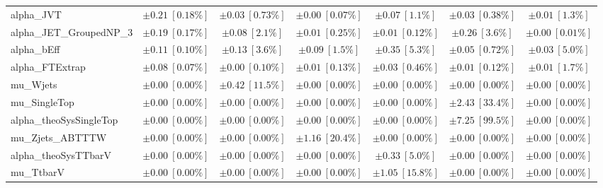 \begin{sidewaystable}
\begin{center}
\begin{tabular*}{\textwidth}{@{\extracolsep{\fill}}lcccccc}
alpha\_JVT         & $\pm 0.21\ [0.18\%] $          & $\pm 0.03\ [0.73\%] $          & $\pm 0.00\ [0.07\%] $          & $\pm 0.07\ [1.1\%] $          & $\pm 0.03\ [0.38\%] $          & $\pm 0.01\ [1.3\%] $       \\
alpha\_JET\_GroupedNP\_3         & $\pm 0.19\ [0.17\%] $          & $\pm 0.08\ [2.1\%] $          & $\pm 0.01\ [0.25\%] $          & $\pm 0.01\ [0.12\%] $          & $\pm 0.26\ [3.6\%] $          & $\pm 0.00\ [0.01\%] $       \\
alpha\_bEff         & $\pm 0.11\ [0.10\%] $          & $\pm 0.13\ [3.6\%] $          & $\pm 0.09\ [1.5\%] $          & $\pm 0.35\ [5.3\%] $          & $\pm 0.05\ [0.72\%] $          & $\pm 0.03\ [5.0\%] $       \\
alpha\_FTExtrap         & $\pm 0.08\ [0.07\%] $          & $\pm 0.00\ [0.10\%] $          & $\pm 0.01\ [0.13\%] $          & $\pm 0.03\ [0.46\%] $          & $\pm 0.01\ [0.12\%] $          & $\pm 0.01\ [1.7\%] $       \\
mu\_Wjets         & $\pm 0.00\ [0.00\%] $          & $\pm 0.42\ [11.5\%] $          & $\pm 0.00\ [0.00\%] $          & $\pm 0.00\ [0.00\%] $          & $\pm 0.00\ [0.00\%] $          & $\pm 0.00\ [0.00\%] $       \\
mu\_SingleTop         & $\pm 0.00\ [0.00\%] $          & $\pm 0.00\ [0.00\%] $          & $\pm 0.00\ [0.00\%] $          & $\pm 0.00\ [0.00\%] $          & $\pm 2.43\ [33.4\%] $          & $\pm 0.00\ [0.00\%] $       \\
alpha\_theoSysSingleTop         & $\pm 0.00\ [0.00\%] $          & $\pm 0.00\ [0.00\%] $          & $\pm 0.00\ [0.00\%] $          & $\pm 0.00\ [0.00\%] $          & $\pm 7.25\ [99.5\%] $          & $\pm 0.00\ [0.00\%] $       \\
mu\_Zjets\_ABTTTW         & $\pm 0.00\ [0.00\%] $          & $\pm 0.00\ [0.00\%] $          & $\pm 1.16\ [20.4\%] $          & $\pm 0.00\ [0.00\%] $          & $\pm 0.00\ [0.00\%] $          & $\pm 0.00\ [0.00\%] $       \\
alpha\_theoSysTTbarV         & $\pm 0.00\ [0.00\%] $          & $\pm 0.00\ [0.00\%] $          & $\pm 0.00\ [0.00\%] $          & $\pm 0.33\ [5.0\%] $          & $\pm 0.00\ [0.00\%] $          & $\pm 0.00\ [0.00\%] $       \\
mu\_TtbarV         & $\pm 0.00\ [0.00\%] $          & $\pm 0.00\ [0.00\%] $          & $\pm 0.00\ [0.00\%] $          & $\pm 1.05\ [15.8\%] $          & $\pm 0.00\ [0.00\%] $          & $\pm 0.00\ [0.00\%] $       \\

\end{tabular*}
\end{center}
\end{sidewaystable}
